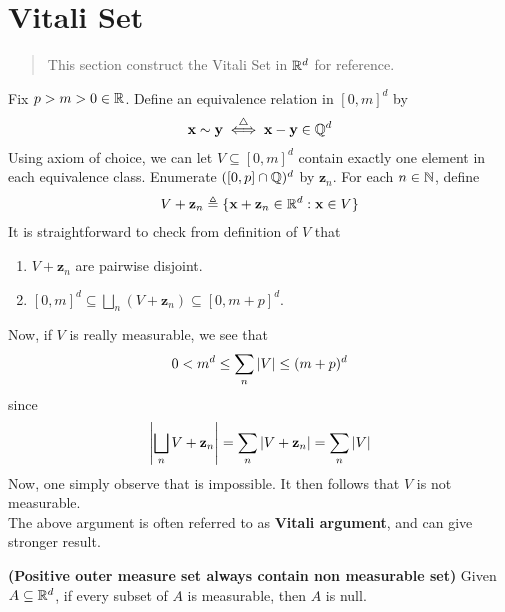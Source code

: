 \documentclass{report}
\begin{document}
\section{Vitali Set}
\label{Vitali Set}
\begin{abstract}
This section construct the Vitali Set in $\mathbb{R}^d$ for reference.
\end{abstract}
\begin{mdframed}
Fix $p>m>0\in\mathbb{R}$. Define an equivalence relation in $[0,m]^d$ by 
\begin{align*}
\textbf{x}\sim  \textbf{y}\overset{\triangle}{\iff }\textbf{x}-\textbf{y}\in\mathbb{Q}^d
\end{align*}
Using axiom of choice, we can let $V\subseteq [0,m]^d$ contain exactly one element in each equivalence class. Enumerate $([0,p]\cap \mathbb{Q})^d$ by $\textbf{z}_n$. For each $n\in\mathbb{N}$, define 
\begin{align*}
V+\textbf{z}_n \triangleq \{ \textbf{x}+\textbf{z}_n\in\mathbb{R}^d: \textbf{x}\in V \}
\end{align*}
It is straightforward to check from definition of $V$ that 
\begin{enumerate}[label=(\alph*)]
  \item $V+\textbf{z}_n$ are pairwise disjoint. 
  \item $[0,m]^d \subseteq \bigsqcup_n (V+\textbf{z}_n)\subseteq [0,m+p]^d$. 
\end{enumerate}
Now, if $V$ is really measurable, we see that 
\begin{align}
\label{con}
0<m^d\leq \sum_n \left|V\right|\leq (m+p)^d
\end{align}
since 
\begin{align*}
\left|\bigsqcup_n  V+\textbf{z}_n\right|= \sum_n \left|V+\textbf{z}_n\right|=\sum_n \left|V\right|
\end{align*}
Now, one simply observe that   is impossible. It then follows that $V$ is not measurable.\\

The above argument is often referred to as \textbf{Vitali argument}, and can give stronger result. 
\end{mdframed}
\begin{theorem}
\textbf{(Positive outer measure set always contain non measurable set)} Given $A\subseteq \mathbb{R}^d$, if every subset of $A$ is measurable, then $A$ is null.  
\end{theorem}
\end{document}
